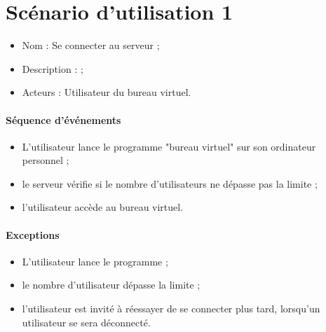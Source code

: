 




\section{Scénario d'utilisation 1}
\begin{itemize}
	\item Nom : Se connecter au serveur ;
	\item Description :  ;
	\item Acteurs : Utilisateur du bureau virtuel.
\end{itemize}

\paragraph{Séquence d'événements}
\begin{itemize}
	\item L'utilisateur lance le programme "bureau virtuel" sur son ordinateur personnel ;
	\item le serveur vérifie si le nombre d'utilisateurs ne dépasse pas la limite ;
	\item l'utilisateur accède au bureau virtuel.
\end{itemize}

\paragraph{Exceptions}
\begin{itemize}
	\item L'utilisateur lance le programme ;
	\item le nombre d'utilisateur dépasse la limite ;
	\item l'utilisateur est invité à réessayer de se connecter plus tard, lorsqu'un utilisateur se sera déconnecté.
\end{itemize}

